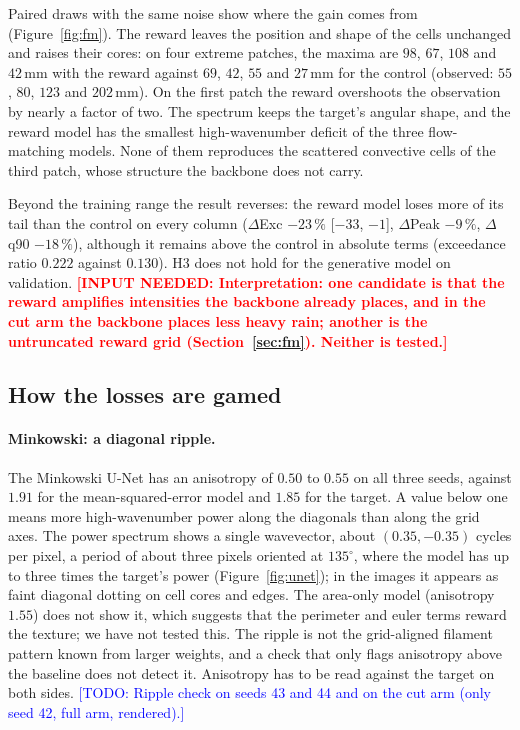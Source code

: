 \documentclass{article}
\newcommand{\needinput}[1]{\textcolor{red}{\textbf{[INPUT NEEDED: #1]}}}
\newcommand{\todo}[1]{\textcolor{blue}{[TODO: #1]}}
\begin{document}
Paired draws with the same noise show where the gain comes from (Figure~\ref{fig:fm}). The reward leaves the position
and shape of the cells unchanged and raises their cores: on four extreme patches, the maxima are $98$, $67$, $108$ and
$42\,\mathrm{mm}$ with the reward against $69$, $42$, $55$ and $27\,\mathrm{mm}$ for the control (observed: $55$, $80$,
$123$ and $202\,\mathrm{mm}$). On the first patch the reward overshoots the observation by nearly a factor of two. The
spectrum keeps the target's angular shape, and the reward model has the smallest high-wavenumber deficit of the three
flow-matching models. None of them reproduces the scattered convective cells of the third patch, whose structure the
backbone does not carry.

Beyond the training range the result reverses: the reward model loses more of its tail than the control on every
column ($\Delta$Exc $-23\,\%$ [$-33$, $-1$], $\Delta$Peak $-9\,\%$, $\Delta$q90 $-18\,\%$), although it remains above
the control in absolute terms (exceedance ratio $0.222$ against $0.130$). H3 does not hold for the generative model on
validation. \needinput{Interpretation: one candidate is that the reward amplifies intensities the backbone already
places, and in the cut arm the backbone places less heavy rain; another is the untruncated reward grid
(Section~\ref{sec:fm}). Neither is tested.}

\subsection{How the losses are gamed}
\label{sec:gaming}
\paragraph{Minkowski: a diagonal ripple.} The Minkowski U-Net has an anisotropy of $0.50$ to $0.55$ on all three seeds,
against $1.91$ for the mean-squared-error model and $1.85$ for the target. A value below one means more high-wavenumber
power along the diagonals than along the grid axes. The power spectrum shows a single wavevector, about
$(0.35, -0.35)$ cycles per pixel, a period of about three pixels oriented at $135^\circ$, where the model has up to three
times the target's power (Figure~\ref{fig:unet}); in the images it appears as faint diagonal dotting on cell cores and
edges. The area-only model (anisotropy $1.55$) does not show it, which suggests that the perimeter and euler terms reward
the texture; we have not tested this. The ripple is not the grid-aligned filament pattern known from larger weights,
and a check that only flags anisotropy above the baseline does not detect it. Anisotropy has to be read against the
target on both sides. \todo{Ripple check on seeds 43 and 44 and on the cut arm (only seed 42, full arm, rendered).}
\end{document}
